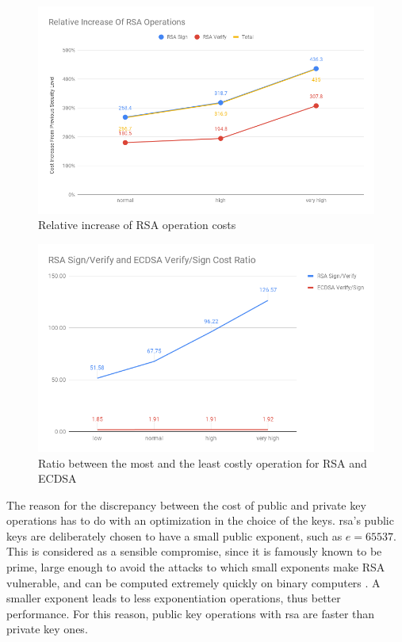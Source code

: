 \begin{figure}
  \centering
  \includegraphics[width=1.0\textwidth]{img/rsa_relative_increase.png}
  \centering \caption{\label{fig:rsa-pub-priv-cost-increase} Relative increase of RSA operation costs}
\end{figure}

\begin{figure}
  \centering
  \includegraphics[width=1.0\textwidth]{img/rsa_ecdsa_operation_ratio.png}
  \centering \caption{\label{fig:rsa-ecdsa-pub-priv-ratio} Ratio between the most and the least costly operation for RSA and ECDSA}
\end{figure}

The reason for the discrepancy between the cost of public and private key operations has to do with an optimization
in the choice of the keys. \gls{rsa}'s public keys are deliberately chosen to have a small public exponent, such as $e=65537$. This is considered as a
sensible compromise, since it is famously known to be prime, large enough to avoid the attacks to which
small exponents make RSA vulnerable, and can be computed extremely quickly on binary computers \cite{boneh2002fast}\cite{muir2006seifert}.
A smaller exponent leads to less exponentiation operations, thus better performance. For this reason, public
key operations with \gls{rsa} are faster than private key ones.

